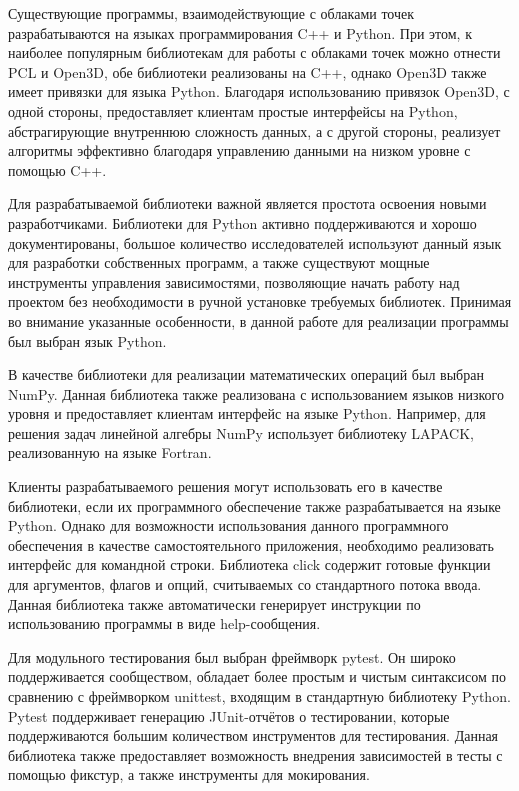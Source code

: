 Существующие программы, взаимодействующие с облаками точек разрабатываются на
языках программирования C++ и Python. При этом, к наиболее популярным
библиотекам для работы с облаками точек можно отнести PCL и Open3D, обе
библиотеки реализованы на C++, однако Open3D также имеет привязки для языка
Python. Благодаря использованию привязок Open3D, с одной стороны, предоставляет
клиентам простые интерфейсы на Python, абстрагирующие внутреннюю сложность
данных, а с другой стороны, реализует алгоритмы эффективно благодаря управлению
данными на низком уровне с помощью C++.

Для разрабатываемой библиотеки важной является простота освоения новыми
разработчиками. Библиотеки для Python активно поддерживаются и хорошо
документированы, большое количество исследователей используют данный язык для
разработки собственных программ, а также существуют мощные инструменты
управления зависимостями, позволяющие начать работу над проектом без
необходимости в ручной установке требуемых библиотек. Принимая во внимание
указанные особенности, в данной работе для реализации программы был выбран язык
Python.

В качестве библиотеки для реализации математических операций был выбран NumPy.
Данная библиотека также реализована с использованием языков низкого уровня и
предоставляет клиентам интерфейс на языке Python. Например, для решения задач
линейной алгебры NumPy использует библиотеку LAPACK, реализованную на языке
Fortran.

Клиенты разрабатываемого решения могут использовать его в качестве библиотеки,
если их программного обеспечение также разрабатывается на языке Python. Однако
для возможности использования данного программного обеспечения в качестве
самостоятельного приложения, необходимо реализовать интерфейс для командной
строки. Библиотека click содержит готовые функции для аргументов, флагов и
опций, считываемых со стандартного потока ввода. Данная библиотека также
автоматически генерирует инструкции по использованию программы в виде
help-сообщения.

Для модульного тестирования был выбран фреймворк pytest. Он широко
поддерживается сообществом, обладает более простым и чистым синтаксисом по
сравнению с фреймворком unittest, входящим в стандартную библиотеку Python.
Pytest поддерживает генерацию JUnit-отчётов о тестировании, которые
поддерживаются большим количеством инструментов для тестирования. Данная
библиотека также предоставляет возможность внедрения зависимостей в тесты с
помощью фикстур, а также инструменты для мокирования.


